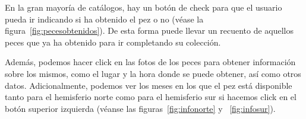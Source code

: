 En la gran mayoría de catálogos, hay un botón de check para que el usuario pueda ir indicando si ha obtenido el pez o no {(v\'ease la figura~\ref{fig:pecesobtenidos})}. De esta forma puede llevar un recuento de aquellos peces que ya ha obtenido para ir completando su colección.\\


\clearpage

Además, podemos hacer click en las fotos de los peces para obtener información sobre los mismos, como el lugar y la hora donde se puede obtener, así como otros datos. Adicionalmente, podemos ver los meses en los que el pez está disponible tanto para el hemisferio norte como para el hemisferio sur si hacemos click en el botón superior izquierda {(v\'eanse las figuras~\ref{fig:infonorte} y ~\ref{fig:infosur})}.\\

